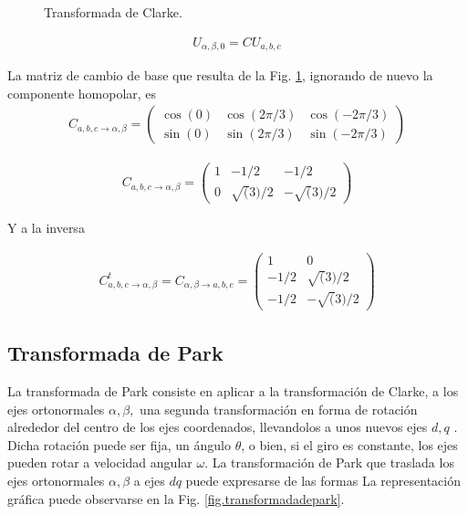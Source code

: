 \documentclass{report}
\begin{document}
\begin{figure}[!h]
\begin{center}
\end{center}
\caption{Transformada de Clarke.} \label{fig.transformadadeclark}
\end{figure}

\begin{eqnarray}
U_{\alpha,\beta,0} = C U_{a,b,c} \label{eq.cambiobaseclarke}
\end{eqnarray}


La matriz de cambio de base que resulta de la Fig. \ref{fig.transformadadeclark}, ignorando de nuevo la componente homopolar, es
\begin{eqnarray}
C_{a,b,c\to\alpha,\beta}=
\left( \begin{array}{cccc}
\cos(0) & \cos(2\pi/3)  & \cos(-2\pi/3)\\
\sin(0) & \sin(2\pi/3)  & \sin(-2\pi/3)
\end{array} \right)  \label{eq.c_cos}
\end{eqnarray} 

\begin{eqnarray}
 C_{a,b,c\to\alpha,\beta} =
\left( \begin{array}{cccc}
1 & -1/2  & -1/2\\
0 & \sqrt(3)/2  & -\sqrt(3)/2 \label{eq.Cabcalfabeta}
\end{array} \right)  
\end{eqnarray}

Y a la inversa

\begin{eqnarray}
C^{t}_{a,b,c\to\alpha,\beta} = C_{\alpha,\beta \to a,b,c}=
\left( \begin{array}{cccc}
1 & 0\\
-1/2 & \sqrt(3)/2\\
-1/2 & -\sqrt(3)/2 \label{eq.Calfabetaabc}
\end{array} \right) 
\end{eqnarray}

\subsection{Transformada de Park} \label{sec.park}

La transformada de Park \cite{cincuentaysiete} consiste en aplicar a la transformación de Clarke, a los ejes ortonormales $\alpha,\beta,$ una segunda transformación en forma de rotación alrededor del centro de los ejes coordenados, llevandolos a unos nuevos ejes $d,q$ \cite{cincuentaytres}. Dicha rotación puede ser fija, un ángulo $\theta$, o bien, si el giro es constante, los ejes pueden rotar a velocidad angular $\omega$. La transformación de Park que traslada los ejes ortonormales $\alpha,\beta$ a ejes $dq$ puede expresarse de las formas
La representación gráfica puede observarse en la Fig. \ref{fig.transformadadepark}.
\end{document}
